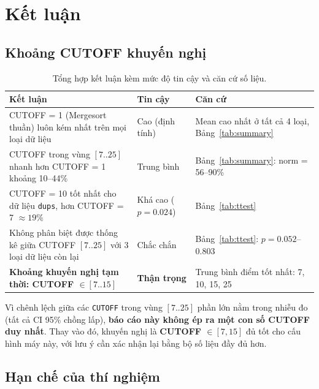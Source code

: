 \documentclass[12pt, a4paper]{article}
\begin{document}
\section{Kết luận}

\subsection{Khoảng CUTOFF khuyến nghị}

\begin{table}[H]
\centering
\caption{Tổng hợp kết luận kèm mức độ tin cậy và căn cứ số liệu.}
\label{tab:conclusion}
\renewcommand{\arraystretch}{1.3}
\begin{tabular}{p{6.5cm} p{3cm} p{4cm}}
\toprule
\textbf{Kết luận} & \textbf{Tin cậy} & \textbf{Căn cứ} \\
\midrule
\rowcolor{rowodd}
CUTOFF = 1 (Mergesort thuần) luôn kém nhất trên mọi loại dữ liệu
& Cao (định tính) & Mean cao nhất ở tất cả 4 loại, Bảng~\ref{tab:summary} \\
\rowcolor{roweven}
CUTOFF trong vùng $[7..25]$ nhanh hơn CUTOFF = 1 khoảng 10--44\%
& Trung bình & Bảng~\ref{tab:summary}: norm = 56--90\% \\
\rowcolor{rowodd}
CUTOFF = 10 tốt nhất cho dữ liệu \texttt{dups}, hơn CUTOFF = 7 $\approx 19\%$
& Khá cao ($p = 0.024$) & Bảng~\ref{tab:ttest} \\
\rowcolor{roweven}
Không phân biệt được thống kê giữa CUTOFF $[7..25]$ với 3 loại dữ liệu còn lại
& Chắc chắn & Bảng~\ref{tab:ttest}: $p = 0.052$--$0.803$ \\
\rowcolor{warnrow}
\textbf{Khoảng khuyến nghị tạm thời: CUTOFF $\in [7..15]$}
& \textbf{Thận trọng} & Trung bình điểm tốt nhất: 7, 10, 15, 25 \\
\bottomrule
\end{tabular}
\end{table}

Vì chênh lệch giữa các \texttt{CUTOFF} trong vùng $[7..25]$ phần lớn nằm trong
nhiễu đo (tất cả CI 95\% chồng lấp), \textbf{báo cáo này không ép ra một con số
CUTOFF duy nhất}. Thay vào đó, khuyến nghị là \textbf{CUTOFF $\in [7, 15]$} đủ tốt
cho cấu hình máy này, với lưu ý cần xác nhận lại bằng bộ số liệu đầy đủ hơn.

\subsection{Hạn chế của thí nghiệm}
\end{document}
